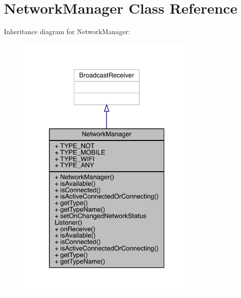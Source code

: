 \hypertarget{classcom_1_1toast_1_1android_1_1gamebase_1_1base_1_1_network_manager}{}\section{Network\+Manager Class Reference}
\label{classcom_1_1toast_1_1android_1_1gamebase_1_1base_1_1_network_manager}


Inheritance diagram for Network\+Manager\+:
\nopagebreak
\begin{figure}[H]
\begin{center}
\leavevmode
\includegraphics[width=256pt]{classcom_1_1toast_1_1android_1_1gamebase_1_1base_1_1_network_manager__inherit__graph}
\end{center}
\end{figure}


